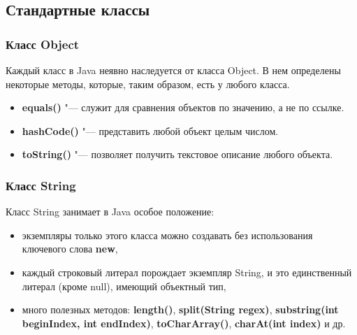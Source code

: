 \documentclass[default]{beamer}
\begin{document}
	\subsection{Стандартные классы}
	\begin{frame}
		\frametitle{Класс Object}
		Каждый класс в Java неявно наследуется от класса Object. В нем определены некоторые методы, которые, таким образом, есть у любого класса.
		\begin{itemize}
			\item \textbf{equals()} "--- служит для сравнения объектов по значению, а не по ссылке.
			\item \textbf{hashCode()} "--- представить любой объект целым числом.
			\item \textbf{toString()} "--- позволяет получить текстовое описание любого объекта.
		\end{itemize}
		\lstObject
	\end{frame}


	\begin{frame}
		\frametitle{Класс String}
		
		Класс String занимает в Java особое положение:
		
		\begin{itemize}
			\item экземпляры только этого класса можно создавать без использования ключевого слова \textbf{new},
			\item каждый строковый литерал порождает экземпляр String, и это единственный литерал (кроме null), имеющий объектный тип,
			\item много полезных методов: \textbf{length()}, \textbf{split(String regex)}, \textbf{substring(int beginIndex, int endIndex)}, \textbf{toCharArray()}, \textbf{charAt(int index)} и др.
		\end{itemize}
		\lstString
	\end{frame}
\end{document}
